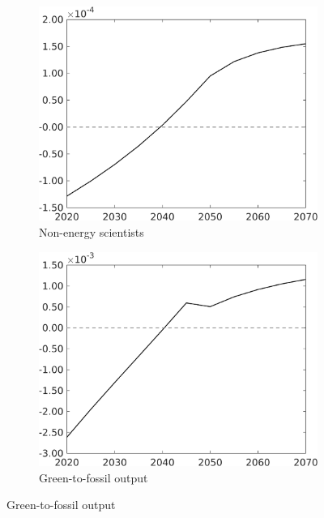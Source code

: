\begin{figure}[h!!!]
\begin{subfigure}{0.4\textwidth}
	\end{subfigure}
	\begin{subfigure}{0.4\textwidth}
		\caption{Non-energy scientists}
		\includegraphics[width=1\textwidth]{../../codding_model/own_basedOnFried/optimalPol_010922_revision/figures/all_13Sept22_Tplus30/CountTAUFPerDif_Opt_target_sn_nsk0_xgr0_knspil0_regime4_spillover0_sep0_extern0_PV1_etaa0.79.png}
	\end{subfigure}
	\begin{subfigure}{0.4\textwidth}
	\caption{Green-to-fossil output}
	\includegraphics[width=1\textwidth]{../../codding_model/own_basedOnFried/optimalPol_010922_revision/figures/all_13Sept22_Tplus30/CountTAUFPerDif_Opt_target_GFF_nsk0_xgr0_knspil0_regime4_spillover0_sep0_extern0_PV1_etaa0.79.png}
\end{subfigure}
\end{figure}
